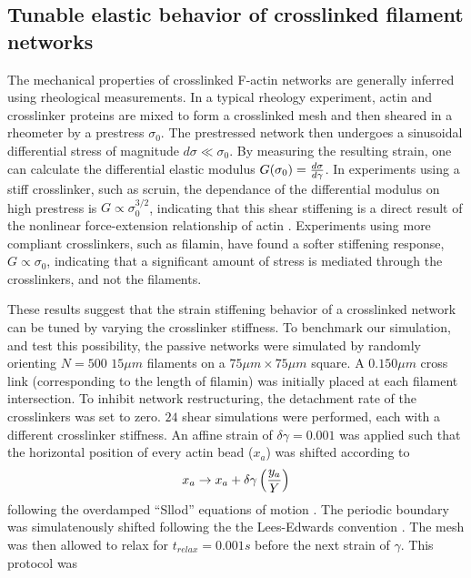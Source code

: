 \documentclass[12pt]{article}
\begin{document}
\subsection{Tunable elastic behavior of crosslinked filament networks}
\par
The mechanical properties of crosslinked F-actin networks are generally
inferred using rheological measurements\cite{gardel2004,koenderink2006,kasza2009,lin2010}.
In a typical rheology experiment, actin and crosslinker proteins are mixed to
form a crosslinked mesh and then sheared in a rheometer by a prestress
$\sigma_0$. The prestressed network then undergoes a sinusoidal
differential stress of magnitude $d\sigma\ll\sigma_0$. By measuring the resulting
strain, one can calculate the differential elastic modulus
$G(\sigma_0) = {d\sigma\over d\gamma}$. In experiments using a stiff
crosslinker, such as scruin, the dependance of the differential modulus on high
prestress is $G\propto\sigma_0^{3/2}$, indicating that this shear stiffening is
a direct result of the nonlinear force-extension relationship of actin 
\cite{gardel2004,lin2010}. Experiments using more compliant crosslinkers,
such as filamin, have found a softer stiffening response, $G\propto\sigma_0$,
indicating that a significant amount of stress is mediated through the
crosslinkers, and not the filaments\cite{kasza2009}.
\par 
These results suggest that the strain stiffening behavior of a crosslinked 
network can be tuned by varying the crosslinker
stiffness. To benchmark our simulation, and test this possibility, the 
passive networks were simulated by randomly orienting $N = 500$ $15\mu m$ 
filaments on a $75\mu m \times 75\mu m$ square. A $0.150\mu m$ cross link
(corresponding to the length of filamin) was initially placed at each filament
intersection.  
To inhibit network restructuring, the detachment rate of the crosslinkers was 
set to zero. $24$ shear simulations were performed, each with a different 
crosslinker stiffness. An affine strain of $\delta\gamma=0.001$ was applied such
that the horizontal position of every actin bead ($x_a$) was shifted according to  
\begin{equation}
  x_a \rightarrow x_a + \delta\gamma \left( {y_a\over Y} \right)
  \label{eqn:sllod}
\end{equation} 
following the overdamped ``Sllod'' equations of motion \cite{evans1984}. The 
periodic boundary was simulatenously shifted following the the Lees-Edwards 
convention \cite{allen}. The mesh was then allowed to relax for
$t_{relax} =0.001 s$ before the next strain of $\gamma$. This protocol was 
\end{document}
